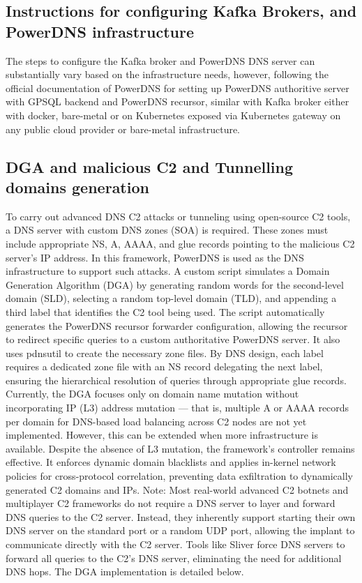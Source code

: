 \documentclass [11pt, proquest] {uwthesis}[2020/02/24]
\begin{document}
\subsection{Instructions for configuring Kafka Brokers, and PowerDNS infrastructure}
The steps to configure the Kafka broker and PowerDNS DNS server can substantially vary based on the infrastructure needs, however, following the official documentation of PowerDNS for setting up PowerDNS authoritive server with GPSQL backend and PowerDNS recursor, similar with Kafka broker either with docker, bare-metal or on Kubernetes exposed via Kubernetes gateway on any public cloud provider or bare-metal infrastructure.

\subsection{DGA and malicious C2 and Tunnelling domains generation}
To carry out advanced DNS C2 attacks or tunneling using open-source C2 tools, a DNS server with custom DNS zones (SOA) is required. These zones must include appropriate NS, A, AAAA, and glue records pointing to the malicious C2 server’s IP address. In this framework, PowerDNS is used as the DNS infrastructure to support such attacks. A custom script simulates a Domain Generation Algorithm (DGA) by generating random words for the second-level domain (SLD), selecting a random top-level domain (TLD), and appending a third label that identifies the C2 tool being used. The script automatically generates the PowerDNS recursor forwarder configuration, allowing the recursor to redirect specific queries to a custom authoritative PowerDNS server. It also uses pdnsutil to create the necessary zone files. By DNS design, each label requires a dedicated zone file with an NS record delegating the next label, ensuring the hierarchical resolution of queries through appropriate glue records. Currently, the DGA focuses only on domain name mutation without incorporating IP (L3) address mutation — that is, multiple A or AAAA records per domain for DNS-based load balancing across C2 nodes are not yet implemented. However, this can be extended when more infrastructure is available. Despite the absence of L3 mutation, the framework’s controller remains effective. It enforces dynamic domain blacklists and applies in-kernel network policies for cross-protocol correlation, preventing data exfiltration to dynamically generated C2 domains and IPs. Note: Most real-world advanced C2 botnets and multiplayer C2 frameworks do not require a DNS server to layer and forward DNS queries to the C2 server. Instead, they inherently support starting their own DNS server on the standard port or a random UDP port, allowing the implant to communicate directly with the C2 server. Tools like Sliver force DNS servers to forward all queries to the C2’s DNS server, eliminating the need for additional DNS hops.
The DGA implementation is detailed below.
\end{document}
